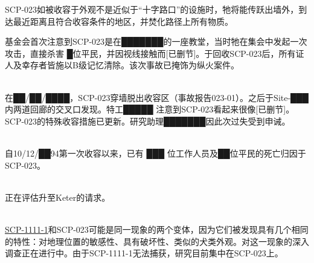 SCP-023如被收容于外观不是近似于“十字路口”的设施时，牠将能传跃出墙外，到达最近距离且符合收容条件的地区，并焚化路径上所有物质。

基金会首次注意到SCP-023是在███████的一座教堂，当时牠在集会中发起一次攻击，直接杀害 █位平民，并因视线接触而[已删节]。于回收SCP-023后，所有证人及幸存者皆施以B级记忆清除。该次事故已掩饰为纵火案件。

\\
在██\slash ██\slash ████，SCP-023穿墙脱出收容区（事故报告023-01）。之后于Site-███内两道回廊的交叉口发现。特工█████ 注意到SCP-023看起来很像[已删节]。SCP-023的特殊收容措施已更新。研究助理███████因此次过失受到申诫。

\\
自10\slash 12\slash ██94第一次收容以来，已有 ███ 位工作人员及██位平民的死亡归因于SCP-023。

\\
正在评估升至Keter的请求。

\\
\hyperref[chap:SCP-1111]{SCP-1111-1}和SCP-023可能是同一现象的两个变体，因为它们被发现具有几个相同的特性：对地理位置的敏感性、具有破坏性、类似的犬类外观。对这一现象的深入调查正在进行中。由于SCP-1111-1无法捕获，研究目前集中在SCP-023上。




